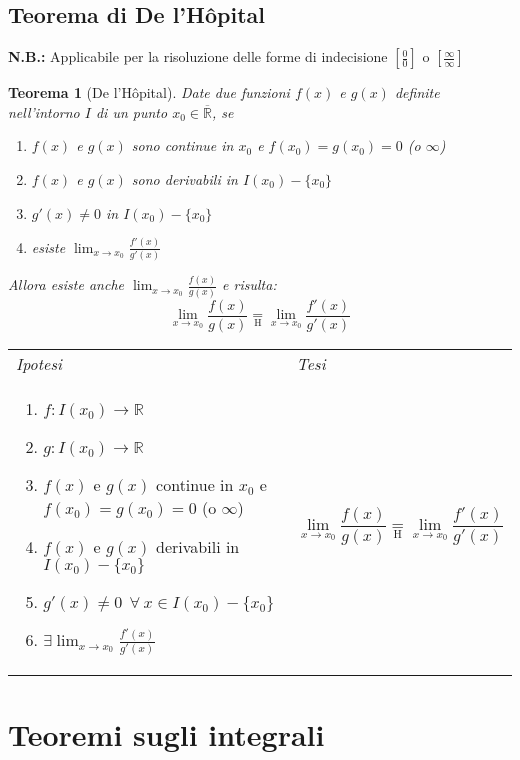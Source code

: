\documentclass{article}     %
\newcommand\R{\mathbb{R}}
\newtheorem*{theorem}{Teorema}
\newenvironment{shadedTheorem}%
  {\begin{mdframed}[backgroundcolor=lightgray!40, linecolor=white, innertopmargin=4pt, innerbottommargin=13pt]\begin{theorem}}%
  {\end{theorem}\end{mdframed}}
\begin{document}
    \subsection{Teorema di De l'Hôpital}
    \textbf{N.B.:} Applicabile per la risoluzione delle forme di indecisione $\left[\frac{0}{0}\right]$ o $\left[\frac{\infty}{\infty}\right]$
        \begin{shadedTheorem}[De l'Hôpital]
            Date due funzioni $f(x)$ e $g(x)$ definite nell'intorno $I$ di un punto $x_0\in \overline{\R}$, se
            \begin{enumerate}
                \item $f(x)$ e $g(x)$ sono continue in $x_0$ e $f(x_0)=g(x_0)=0$ (o $\infty$)
                \item $f(x)$ e $g(x)$ sono derivabili in $I(x_0)-\{x_0\}$ 
                \item $g'(x)\neq 0$ in $I(x_0)-\{x_0\}$
                \item esiste $\lim_{x\to x_0}\frac{f'(x)}{g'(x)}$
            \end{enumerate}
            Allora esiste anche $\lim_{x\to x_0}    \frac{f(x)}{g(x)}$ e risulta:
            \[\lim_{x\to x_0}\frac{f(x)}{g(x)}\underset{\mathrm{H}}{=}\lim_{x\to x_0}\frac{f'(x)}{g'(x)}\]
        \end{shadedTheorem}
        \begin{tabular}{m{}m{}}
            \textit{Ipotesi} & \textit{Tesi}  \\
            \begin{enumerate}
                \item $f: I(x_0)\to \R$
                \item $g: I(x_0)\to \R$
                \item $f(x)$ e $g(x)$ continue in $x_0$ e $f(x_0)=g(x_0)=0$ (o $\infty$)
                \item $f(x)$ e $g(x)$ derivabili in $I(x_0)-\{x_0\}$ 
                \item $g'(x)\neq 0 ~~\forall~ x \in I(x_0)-\{x_0\}$
                \item $\exists \lim_{x\to x_0}\frac{f'(x)}{g'(x)}$
            \end{enumerate} & \[\lim_{x\to x_0}\frac{f(x)}{g(x)}\underset{\mathrm{H}}{=}\lim_{x\to x_0}\frac{f'(x)}{g'(x)}\]
        \end{tabular}
    
\section{Teoremi sugli integrali}
\end{document}

